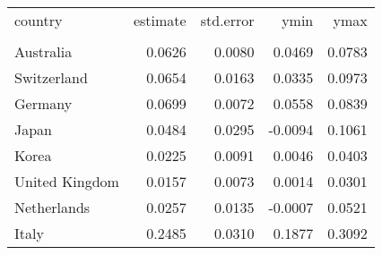 \begin{tabular}{lrrrr}
   \toprule 
 
country & estimate & std.error & ymin & ymax \\ 

\cmidrule(lr){1-5} 
 
\\[-1.8ex]  
 
Australia & 0.0626 & 0.0080 & 0.0469 & 0.0783 \\ 
  Switzerland & 0.0654 & 0.0163 & 0.0335 & 0.0973 \\ 
  Germany & 0.0699 & 0.0072 & 0.0558 & 0.0839 \\ 
  Japan & 0.0484 & 0.0295 & -0.0094 & 0.1061 \\ 
  Korea & 0.0225 & 0.0091 & 0.0046 & 0.0403 \\ 
  United Kingdom & 0.0157 & 0.0073 & 0.0014 & 0.0301 \\ 
  Netherlands & 0.0257 & 0.0135 & -0.0007 & 0.0521 \\ 
  Italy & 0.2485 & 0.0310 & 0.1877 & 0.3092 \\ 
   \bottomrule  
\end{tabular}
